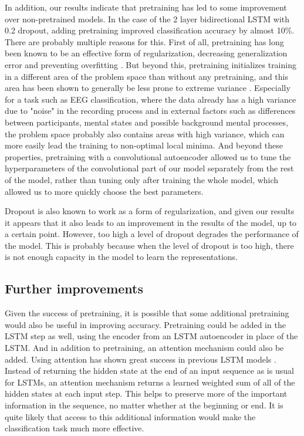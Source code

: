 \documentclass{article}
\begin{document}
In addition, our results indicate that pretraining has led to some improvement over non-pretrained models. In the case of the 2 layer bidirectional LSTM with 0.2 dropout, adding pretraining improved classification accuracy by almost 10\%. There are probably multiple reasons for this. First of all, pretraining has long been known to be an effective form of regularization, decreasing generalization error and preventing overfitting \cite{pretraining}. But beyond this, pretraining initializes training in a different area of the problem space than without any pretraining, and this area has been shown to generally be less prone to extreme variance \cite{pretraining}. Especially for a task such as EEG classification, where the data already has a high variance due to "noise" in the recording process and in external factors such as differences between participants, mental states and possible background mental processes, the problem space probably also contains areas with high variance, which can more easily lead the training to non-optimal local minima. And beyond these properties, pretraining with a convolutional autoencoder allowed us to tune the hyperparameters of the convolutional part of our model separately from the rest of the model, rather than tuning only after training the whole model, which allowed us to more quickly choose the best parameters.

Dropout is also known to work as a form of regularization, and given our results it appears that it also leads to an improvement in the results of the model, up to a certain point. However, too high a level of dropout degrades the performance of the model. This is probably because when the level of dropout is too high, there is not enough capacity in the model to learn the representations.
\subsection{Further improvements}
Given the success of pretraining, it is possible that some additional pretraining would also be useful in improving accuracy. Pretraining could be added in the LSTM step as well, using the encoder from an LSTM autoencoder in place of the LSTM. And in addition to pretraining, an attention mechanism could also be added. Using attention has shown great success in previous LSTM models \cite{attention}. Instead of returning the hidden state at the end of an input sequence as is usual for LSTMs, an attention mechanism returns a learned weighted sum of all of the hidden states at each input step. This helps to preserve more of the important information in the sequence, no matter whether at the beginning or end. It is quite likely that access to this additional information would make the classification task much more effective.
\end{document}
